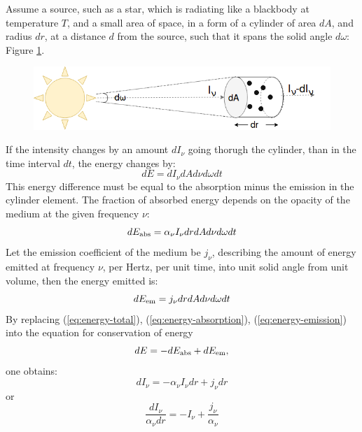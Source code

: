 Assume a source, such as a star, which is radiating like a blackbody at temperature $T$, and a small area of space, in a form of a cylinder of area $dA$, and radius $dr$, at a distance $d$ from the source, such that it spans the solid angle $d\omega$: Figure \ref{fig:rad-trans}.

\begin{figure}[h]
	\centering
	\includegraphics[width=\textwidth]{img/rad-trans}%
  	\caption{}
  	\label{fig:rad-trans}
\end{figure}

If the intensity changes by an amount $dI_{\nu}$ going thorugh the cylinder, than in the time interval $dt$, the energy changes by:
%
\begin{equation}\label{eq:energy-total}
	dE = dI_\nu dA d\nu d\omega dt
\end{equation}
%
This energy difference must be equal to the absorption minus the emission in the cylinder element. The fraction of absorbed energy depends on the opacity of the medium at the given frequency $\nu$:
%
\begin{equation}\label{eq:energy-absorption}
	dE_{\rm{abs}} = \alpha_{\nu} I_{\nu} dr dA d\nu d\omega dt
\end{equation}
%
Let the emission coefficient of the medium be $j_{\nu}$, describing the amount of energy emitted at frequency $\nu$, per Hertz, per unit time, into unit solid angle from unit volume, then the energy emitted is:
%
\begin{equation}\label{eq:energy-emission}
	dE_{\rm{em}} = j_{\nu} dr dA d\nu d\omega dt
\end{equation}
%
By replacing (\ref{eq:energy-total}), (\ref{eq:energy-absorption}), (\ref{eq:energy-emission}) into the equation for conservation of energy 
%
\begin{equation}
	dE = -dE_{\rm{abs}} + dE_{\rm{em}},
\end{equation}
%
one obtains:
%
\begin{equation}
	dI_{\nu}= - \alpha_{\nu} I_{\nu} dr  + j_{\nu} dr
\end{equation}
%
or
%
\begin{equation}\label{eq:rad-transf-1}
	\frac{dI_{\nu}}{\alpha_{\nu}dr} = -I_{\nu} + \frac{j_{\nu}}{\alpha_{\nu}}
\end{equation}

